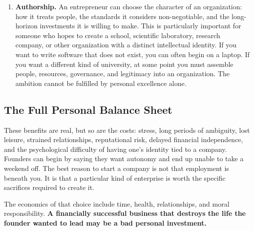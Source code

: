 \begin{enumerate}[label=\textbf{\arabic*.},leftmargin=11pt,itemsep=1.5pt,topsep=1.5pt,parsep=0pt]
  \item \textbf{Authorship.} An entrepreneur can choose the character of an organization: how it treats people, the standards it considers non-negotiable, and the long-horizon investments it is willing to make. This is particularly important for someone who hopes to create a school, scientific laboratory, research company, or other organization with a distinct intellectual identity. If you want to write software that does not exist, you can often begin on a laptop. If you want a different kind of university, at some point you must assemble people, resources, governance, and legitimacy into an organization. The ambition cannot be fulfilled by personal excellence alone.
\end{enumerate}

\subsection{The Full Personal Balance Sheet}

These benefits are real, but so are the costs: stress, long periods of ambiguity, lost leisure, strained relationships, reputational risk, delayed financial independence, and the psychological difficulty of having one's identity tied to a company. Founders can begin by saying they want autonomy and end up unable to take a weekend off. The best reason to start a company is not that employment is beneath you. It is that a particular kind of enterprise is worth the specific sacrifices required to create it.

The economics of that choice include time, health, relationships, and moral responsibility. \textbf{A financially successful business that destroys the life the founder wanted to lead may be a bad personal investment.}
